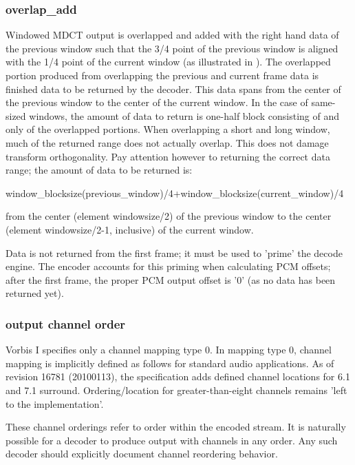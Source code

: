 \subsubsection{overlap\_add}

Windowed MDCT output is overlapped and added with the right hand data
of the previous window such that the 3/4 point of the previous window
is aligned with the 1/4 point of the current window (as illustrated in
).  The overlapped portion
produced from overlapping the previous and current frame data is
finished data to be returned by the decoder.  This data spans from the
center of the previous window to the center of the current window.  In
the case of same-sized windows, the amount of data to return is
one-half block consisting of and only of the overlapped portions. When
overlapping a short and long window, much of the returned range does not
actually overlap.  This does not damage transform orthogonality.  Pay
attention however to returning the correct data range; the amount of
data to be returned is:

\begin{programlisting}
window_blocksize(previous_window)/4+window_blocksize(current_window)/4
\end{programlisting}

from the center (element windowsize/2) of the previous window to the
center (element windowsize/2-1, inclusive) of the current window.

Data is not returned from the first frame; it must be used to 'prime'
the decode engine.  The encoder accounts for this priming when
calculating PCM offsets; after the first frame, the proper PCM output
offset is '0' (as no data has been returned yet).



\subsubsection{output channel order}

Vorbis I specifies only a channel mapping type 0.  In mapping type 0,
channel mapping is implicitly defined as follows for standard audio
applications. As of revision 16781 (20100113), the specification adds
defined channel locations for 6.1 and 7.1 surround.  Ordering/location
for greater-than-eight channels remains 'left to the implementation'.

These channel orderings refer to order within the encoded stream.  It
is naturally possible for a decoder to produce output with channels in
any order. Any such decoder should explicitly document channel
reordering behavior.

